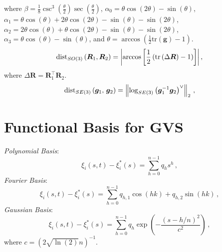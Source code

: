 where $\beta = \frac{1}{8}\csc ^{3}\left(\frac{\theta}{2}\right)\sec \left(\frac{\theta}{2}\right)$, $\alpha_0 = \theta \cos \left(2\theta \right) - \sin \left(\theta \right)$, $\alpha_1 = \theta \cos \left(\theta \right)+2\theta \cos \left(2\theta \right)-\sin \left(\theta \right)-\sin \left(2\theta \right)$, $\alpha_2 = 2\theta \cos \left(\theta \right)+\theta \cos \left(2\theta \right)-\sin \left(\theta \right)-\sin \left(2\theta \right)$, $\alpha_3 = \theta \cos \left(\theta \right)-\sin \left(\theta \right)$, and
$\theta = \arccos\left(\frac{1}{2} \mathrm{tr}\left(\bm{g}\right) - 1\right)$.
\begin{equation} \label{eq:distso3_definition}
    \textnormal{dist}_{SO(3)}\left(\bm{R}_1, \bm{R}_2\right) = \left\lvert\arccos\left[\frac{1}{2}\left(\mathrm{tr}\left(\Delta\bm{R}\right) - 1\right)\right]\right\rvert ,
\end{equation}
where $\Delta\bm{R} = \bm{R}_1^{\top} \bm{R}_2$.
\begin{equation} \label{eq:distse3_defintion}
    \textnormal{dist}_{SE(3)}\left(\bm{g}_1, \, \bm{g}_2\right) = \left\lVert\log_{SE(3)}\left(\bm{g}_{1}^{-1} \bm{g}_2\right)^{\vee}\right\rVert_2 \, ,
\end{equation}

\section*{Functional Basis for \ac{GVS}}
\textit{Polynomial Basis}:
\begin{equation} \label{eq:polynomial_basis}
    \xi_i(s, t) - \xi_i^{*}(s) = \sum_{h = 0}^{n - 1} q_h s^{h} \, ,
\end{equation}
\textit{Fourier Basis}:
\begin{equation} \label{eq:fourier_basis}
    \xi_i(s, t) - \xi_i^{*}(s) = \sum_{h = 0}^{n - 1} q_{h, 1} \cos(h k) + q_{h, 2} \sin(h k) \, ,
\end{equation}
\textit{Gaussian Basis}:
\begin{equation} \label{eq:gaussian_basis}
    \xi_i(s, t) - \xi_i^{*}(s) = \sum_{h = 0}^{n - 1} q_{h} \exp\left(- \frac{\left(s - h/n\right)^{2}}{c^2} \right) \, ,
\end{equation}
where $c = \left(2 \sqrt{\ln\left(2\right)} n\right)^{-1}$.

